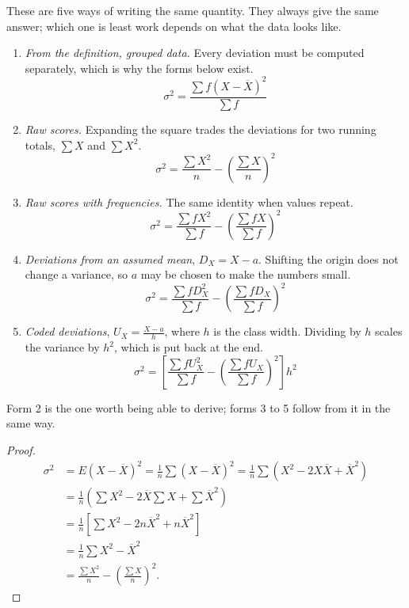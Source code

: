 \documentclass[11pt,a4paper]{article}
\theoremstyle{definition}
\begin{document}
These are five ways of writing the same quantity. They always give the same answer; which
one is least work depends on what the data looks like.

\begin{enumerate}
\item \emph{From the definition, grouped data.} Every deviation must be computed
separately, which is why the forms below exist.
\[\sigma^2=\frac{\sum f(X-\overline{X})^2}{\sum f}\]

\item \emph{Raw scores.} Expanding the square trades the deviations for two running totals,
$\sum X$ and $\sum X^2$.
\[\sigma^2=\frac{\sum X^2}{n}-\left(\frac{\sum X}{n}\right)^{2}\]

\item \emph{Raw scores with frequencies.} The same identity when values repeat.
\[\sigma^2=\frac{\sum fX^2}{\sum f}-\left(\frac{\sum fX}{\sum f}\right)^{2}\]

\item \emph{Deviations from an assumed mean}, $D_X=X-a$. Shifting the origin does not change
a variance, so $a$ may be chosen to make the numbers small.
\[\sigma^2=\frac{\sum fD_X^{2}}{\sum f}-\left(\frac{\sum fD_X}{\sum f}\right)^{2}\]

\item \emph{Coded deviations}, $U_X=\frac{X-a}{h}$, where $h$ is the class width. Dividing
by $h$ scales the variance by $h^2$, which is put back at the end.
\[\sigma^2=\left[\frac{\sum fU_X^{2}}{\sum f}-\left(\frac{\sum fU_X}{\sum f}\right)^{2}\right]h^{2}\]
\end{enumerate}

Form 2 is the one worth being able to derive; forms 3 to 5 follow from it in the same way.

\begin{proof}
\begin{align*}
\sigma^2 &= E(X-\overline{X})^2=\frac{1}{n}\sum (X-\overline{X})^2
          =\frac{1}{n}\sum \left(X^2-2X\overline{X}+\overline{X}^2\right)\\
         &=\frac{1}{n}\left(\sum X^2-2\overline{X}\sum X +\sum \overline{X}^2\right)\\
         &=\frac{1}{n}\left[\sum X^2-2n\overline{X}^2+n\overline{X}^2\right]\\
         &=\frac{1}{n}\sum X^2-\overline{X}^2\\
         &=\frac{\sum X^2}{n}-\left(\frac{\sum X}{n}\right)^{2}.
\end{align*}
\end{proof}
\end{document}
